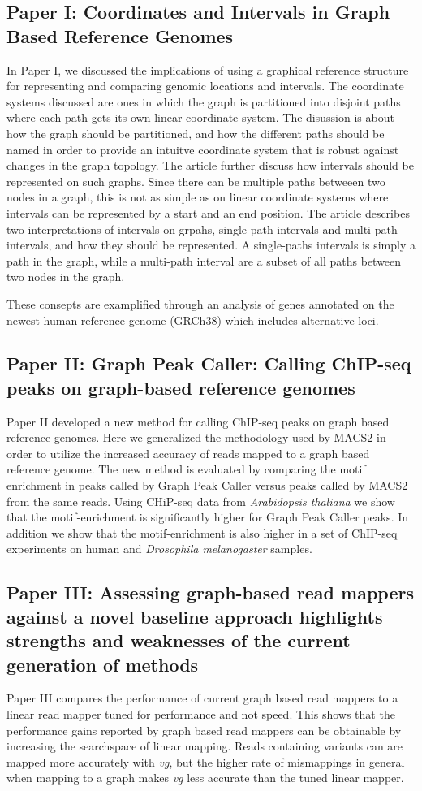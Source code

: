 \subsection*{Paper I: Coordinates and Intervals in Graph Based Reference Genomes}
In Paper I, we discussed the implications of using a graphical reference structure for representing and comparing genomic locations and intervals.
The coordinate systems discussed are ones in which the graph is partitioned into disjoint paths where each path gets its own linear coordinate system.
The disussion is about how the graph should be partitioned, and how the different paths should be named in order to provide an intuitve coordinate system that is robust against changes in the graph topology. 
The article further discuss how intervals should be represented on such graphs.
Since there can be multiple paths betweeen two nodes in a graph, this is not as simple as on linear coordinate systems where intervals can be represented by a start and an end position.
The article describes two interpretations of intervals on grpahs, single-path intervals and multi-path intervals, and how they should be represented.
A single-paths intervals is simply a path in the graph, while a multi-path interval are a subset of all paths between two nodes in the graph. 

These consepts are examplified through an analysis of genes annotated on the newest human reference genome (GRCh38) which includes alternative loci.


\subsection*{Paper II: Graph Peak Caller: Calling ChIP-seq peaks on graph-based reference genomes}
Paper II developed a new method for calling ChIP-seq peaks on graph based reference genomes.
Here we generalized the methodology used by MACS2 in order to utilize the increased accuracy of reads mapped to a graph based reference genome.
The new method is evaluated by comparing the motif enrichment in peaks called by Graph Peak Caller versus peaks called by MACS2 from the same reads.
Using CHiP-seq data from \emph{Arabidopsis thaliana} we show that the motif-enrichment is significantly higher for Graph Peak Caller peaks.
In addition we show that the motif-enrichment is also higher in a set of ChIP-seq experiments on human and \emph{Drosophila melanogaster} samples.

\subsection*{Paper III: Assessing graph-based read mappers against a novel baseline approach highlights strengths and weaknesses of the current generation of methods}
Paper III compares the performance of current graph based read mappers to a linear read mapper tuned for performance and not speed.
This shows that the performance gains reported by graph based read mappers can be obtainable by increasing the searchspace of linear mapping.
Reads containing variants can are mapped more accurately with \emph{vg}, but the higher rate of mismappings in general when mapping to a graph makes \emph{vg} less accurate than the tuned linear mapper.

